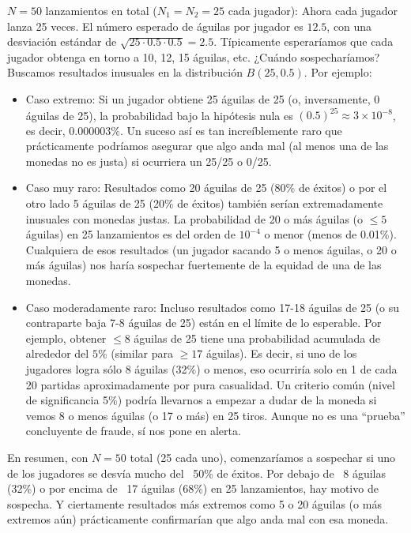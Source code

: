 \documentclass[11pt,letterpaper]{article}
\begin{document}
$N=50$ lanzamientos en total ($N_1=N_2=25$ cada jugador): Ahora cada jugador lanza 25 veces. El número esperado de águilas por jugador es $12.5$, con una desviación estándar de $\sqrt{25 \cdot 0.5 \cdot 0.5} = 2.5$. Típicamente esperaríamos que cada jugador obtenga en torno a 10, 12, 15 águilas, etc. ¿Cuándo sospecharíamos? Buscamos resultados inusuales en la distribución $B(25,0.5)$. Por ejemplo:
    \begin{itemize}
        \item Caso extremo: Si un jugador obtiene 25 águilas de 25 (o, inversamente, 0 águilas de 25), la probabilidad bajo la hipótesis nula es $(0.5)^{25} \approx 3 \times 10^{-8}$, es decir, $0.000003\%$. Un suceso así es tan increíblemente raro que prácticamente podríamos asegurar que algo anda mal (al menos una de las monedas no es justa) si ocurriera un 25/25 o 0/25.
        \item Caso muy raro: Resultados como 20 águilas de 25 (80\% de éxitos) o por el otro lado 5 águilas de 25 (20\% de éxitos) también serían extremadamente inusuales con monedas justas. La probabilidad de 20 o más águilas (o $\le5$ águilas) en 25 lanzamientos es del orden de $10^{-4}$ o menor (menos de 0.01\%). Cualquiera de esos resultados (un jugador sacando 5 o menos águilas, o 20 o más águilas) nos haría sospechar fuertemente de la equidad de una de las monedas.
        \item Caso moderadamente raro: Incluso resultados como 17-18 águilas de 25 (o su contraparte baja 7-8 águilas de 25) están en el límite de lo esperable. Por ejemplo, obtener $\le 8$ águilas de 25 tiene una probabilidad acumulada de alrededor del $5\%$ (similar para $\ge 17$ águilas). Es decir, si uno de los jugadores logra sólo 8 águilas (32\%) o menos, eso ocurriría solo en 1 de cada 20 partidas aproximadamente por pura casualidad. Un criterio común (nivel de significancia 5\%) podría llevarnos a empezar a dudar de la moneda si vemos 8 o menos águilas (o 17 o más) en 25 tiros. Aunque no es una “prueba” concluyente de fraude, sí nos pone en alerta.
    \end{itemize}
    
    En resumen, con $N=50$ total (25 cada uno), comenzaríamos a sospechar si uno de los jugadores se desvía mucho del ~50\% de éxitos. Por debajo de ~8 águilas (32\%) o por encima de ~17 águilas (68\%) en 25 lanzamientos, hay motivo de sospecha. Y ciertamente resultados más extremos como 5 o 20 águilas (o más extremos aún) prácticamente confirmarían que algo anda mal con esa moneda.
  
\end{document}
